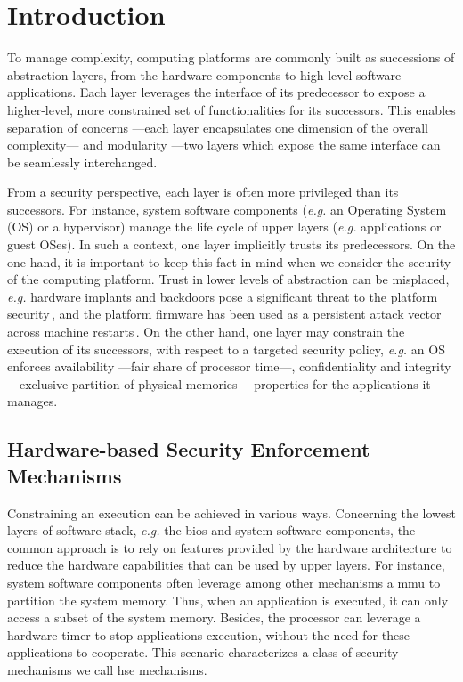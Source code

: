 \chapter{Introduction}
\label{chapter:introduction}


\vspace{1cm}\noindent
%
To manage complexity, computing platforms are commonly built as successions of
abstraction layers, from the hardware components to high-level software
applications.
%
Each layer leverages the interface of its predecessor to expose a higher-level,
more constrained set of functionalities for its successors.
%
This enables separation of concerns ---each layer encapsulates one dimension of
the overall complexity--- and modularity ---two layers which expose the same
interface can be seamlessly interchanged.

From a security perspective, each layer is often more privileged than its
successors.
%
For instance, system software components (\emph{e.g.} an Operating System (OS)
or a hypervisor) manage the life cycle of upper layers (\emph{e.g.} applications
or guest OSes).
%
In such a context, one layer implicitly trusts its predecessors.
%
On the one hand, it is important to keep this fact in mind when we consider the
security of the computing platform.
%
Trust in lower levels of abstraction can be misplaced, \emph{e.g.} hardware
implants and backdoors pose a significant threat to the platform
security\,\cite{yang2016a2}, and the platform firmware has been used as a
persistent attack vector across machine restarts\,\cite{embleton2013smm}.
%
On the other hand, one layer may constrain the execution of its successors, with
respect to a targeted security policy, \emph{e.g.}  an OS enforces availability
---fair share of processor time---, confidentiality and integrity ---exclusive
partition of physical memories--- properties for the applications it manages.

\section{Hardware-based Security Enforcement Mechanisms}

Constraining an execution can be achieved in various ways.
%
Concerning the lowest layers of software stack, \emph{e.g.} the \ac{bios} and
system software components, the common approach is to rely on features provided
by the hardware architecture to reduce the hardware capabilities that can be
used by upper layers.
%
For instance, system software components often leverage among other mechanisms a
\ac{mmu} to partition the system memory.
%
Thus, when an application is executed, it can only access a subset of the system
memory.
%
Besides, the processor can leverage a hardware timer to stop applications
execution, without the need for these applications to cooperate.
%
This scenario characterizes a class of security mechanisms we call \ac{hse}
mechanisms.


